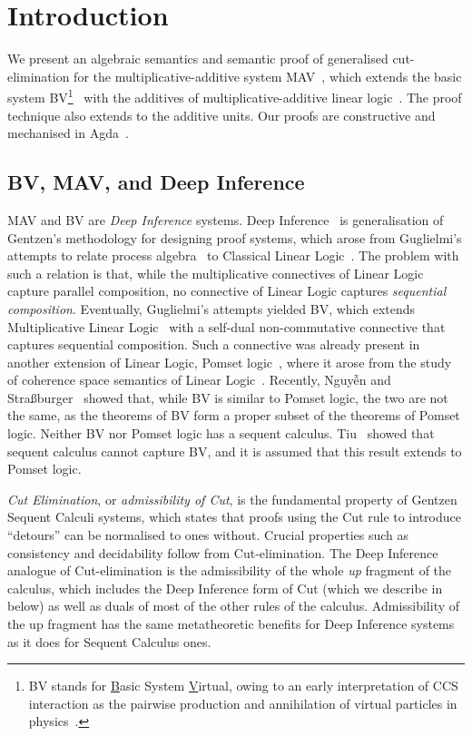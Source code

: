 \section{Introduction}\label{sec:introduction}

We present an algebraic semantics and semantic proof of generalised cut-elimination for the multiplicative-additive system MAV~\cite{Horne15:mav}, which extends the basic system BV\footnote{
      BV stands for \underline{B}asic System \underline{V}irtual, owing to an early interpretation of CCS interaction as the pairwise production and annihilation of virtual particles in physics~\cite[]{Horne15:mav}.
}~\cite{Guglielmi99:bv,Guglielmi07:sis} with the additives of multiplicative-additive linear logic~\cite[MALL]{Girard87:ll}. The proof technique also extends to the additive units.
Our proofs are constructive and mechanised in Agda~\cite{Agda264}.

\subsection{BV, MAV, and Deep Inference}

MAV and BV are \emph{Deep Inference} systems. Deep Inference~\cite{Guglielmi14:di} is generalisation of Gentzen's methodology for designing proof systems, which arose from Guglielmi's attempts to relate process algebra~\cite[CCS]{Milner80:CCS,Milner89:CC} to Classical Linear Logic~\cite[CLL]{Girard87:ll}.
The problem with such a relation is that, while the multiplicative connectives of Linear Logic capture parallel composition, no connective of Linear Logic captures \emph{sequential composition}.
Eventually, Guglielmi's attempts yielded BV, which extends Multiplicative Linear Logic~\cite[MLL]{Girard87:ll} with a self-dual non-commutative connective that captures sequential composition.
Such a connective was already present in another extension of Linear Logic, Pomset logic~\cite{Retore97:pomset}, where it arose from the study of coherence space semantics of Linear Logic~\cite[]{GirardTL89:proofs}.
Recently, Nguyễn and Stra{\ss}burger~\cite{NguyenS22:bvisnotpl} showed that, while BV is similar to Pomset logic, the two are not the same, as the theorems of BV form a proper subset of the theorems of Pomset logic.
Neither BV nor Pomset logic has a sequent calculus. Tiu~\cite{Tiu06:sisii} showed that sequent calculus cannot capture BV, and it is assumed that this result extends to Pomset logic.

\emph{Cut Elimination}, or \emph{admissibility of Cut}, is the fundamental property of Gentzen Sequent Calculi systems, which states that proofs using the Cut rule to introduce ``detours'' can be normalised to ones without. Crucial properties such as consistency and decidability follow from Cut-elimination. The Deep Inference analogue of Cut-elimination is the admissibility of the whole \emph{up} fragment of the calculus, which includes the Deep Inference form of Cut (which we describe in  below) as well as duals of most of the other rules of the calculus. Admissibility of the up fragment has the same metatheoretic benefits for Deep Inference systems as it does for Sequent Calculus ones.

